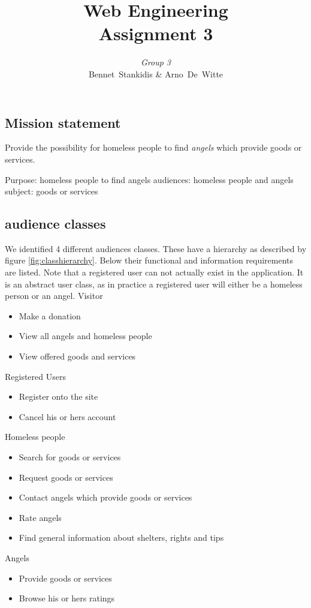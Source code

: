 \documentclass[a4paper]{report}
\author{\textit{Group 3}\\ Bennet~Stankidis \& Arno~De~Witte}
\title{{\Huge Web Engineering}\\Assignment 3}
\begin{document}
\maketitlepage
\tableofcontents

\chapter{}
\section{Mission statement}
Provide the possibility for homeless people to find \emph{angels} which provide goods or services.

Purpose: homeless people to find angels
audiences: homeless people and angels
subject: goods or services

\section{audience classes}
We identified 4 different audiences classes. These have a hierarchy as described by figure \ref{fig:classhierarchy}. Below their functional and information requirements are listed. Note that a registered user can not actually exist in the application. It is an abstract user class, as in practice a registered user will either be a homeless person or an angel.
Visitor
\begin{itemize}
	\item Make a donation
	\item View all angels and homeless people
	\item View offered goods and services
\end{itemize}

Registered Users
\begin{itemize}
	\item Register onto the site
	\item Cancel his or hers account
\end{itemize}

Homeless people
\begin{itemize}
	\item Search for goods or services
	\item Request goods or services
	\item Contact angels which provide goods or services
	\item Rate angels
	\item Find general information about shelters, rights and tips
\end{itemize}

Angels
\begin{itemize}
	\item Provide goods or services
	\item Browse his or hers ratings
\end{itemize}
\end{document}
